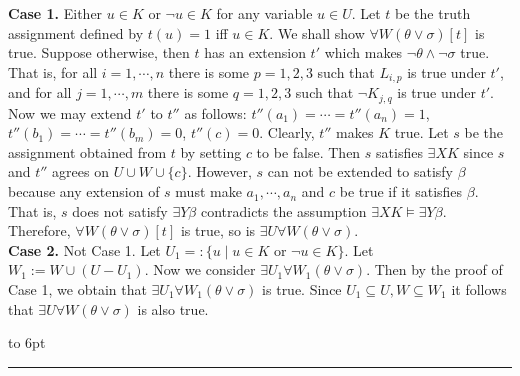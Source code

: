 \documentclass[12pt]{article}
\newenvironment{proof}{\parindent=0pt{\bf Proof: }}{
   \hspace*{\fill}\hbox to 6pt{\leaders\hrule width 6pt height 6pt\hfill}\par}
\begin{document}
\begin{proof}
{\bf Case 1.} Either $u\in K$ or $\neg u\in K$ for any variable $u\in U$. Let $t$ be the truth assignment defined by $t(u)=1$ iff $u\in K$. We shall show $\forall W(\theta\vee \sigma)[t]$ is true. Suppose otherwise, then $t$ has an extension $t'$ which makes $\neg\theta \wedge \neg \sigma$ true.
That is, for all $i=1,\cdots, n$ there is some $p=1,2,3$ such that $L_{i,p}$ is true under $t'$, and for all $j=1,\cdots,m$ there is some $q=1,2,3$ such that $\neg K_{j,q}$ is true under $t'$. Now we may extend $t'$ to $t''$ as follows: $t''(a_1)=\cdots=t''(a_n)=1$, $t''(b_1)=\cdots=t''(b_m)=0$, $t''(c)=0$. Clearly, $t''$ makes $K$ true. Let $s$ be the assignment obtained from $t$ by setting $c$ to be false. Then $s$ satisfies $\exists X K$ since $s$ and $t''$ agrees on $U\cup W\cup\{c\}$. However, $s$ can not be extended to satisfy $\beta$ because any extension of $s$ must make $a_1,\cdots, a_n$ and $c$ be true if it satisfies $\beta$. That is, $s$ does not satisfy $\exists Y\beta$ contradicts the assumption $\exists X K\models\exists Y\beta$.
Therefore, $\forall W(\theta\vee \sigma)[t]$ is true, so is $\exists U\forall W(\theta\vee \sigma)$.\\

{\bf Case 2.} Not Case 1. Let $U_1=:\{u\mid u\in K \mbox{ or }\neg u\in K\}$. Let $W_1:=W\cup (U-U_1)$. Now we consider $\exists U_1\forall W_1(\theta\vee\sigma)$. Then by the proof of Case 1, we obtain that $\exists U_1\forall W_1(\theta\vee\sigma)$ is true. Since $U_1\subseteq U, W\subseteq W_1$ it follows that $\exists U\forall W(\theta\vee\sigma)$ is also true.

\color{black}







\end{proof}
\vspace*{3mm}
\end{document}
